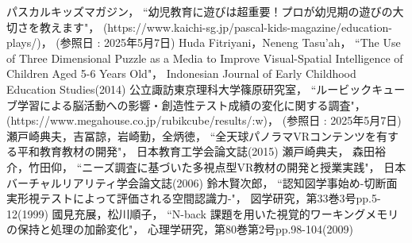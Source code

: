 \begin{thebibliography}{9}
    パスカルキッズマガジン，
    “幼児教育に遊びは超重要！プロが幼児期の遊びの大切さを教えます"，
    (https://www.kaichi-sg.jp/pascal-kids-magazine/education-plays/)，
    (参照日 : 2025年5月7日)
    Huda Fitriyani，Neneng Tasu’ah，
    “The Use of Three Dimensional Puzzle as a Media to Improve Visual-Spatial Intelligence of Children Aged 5-6 Years Old"，
    Indonesian Journal of Early Childhood Education Studies(2014)
    公立諏訪東京理科大学篠原研究室，
    “ルービックキューブ学習による脳活動への影響・創造性テスト成績の変化に関する調査"，
    (https://www.megahouse.co.jp/rubikcube/results/:w)，
    (参照日 : 2025年5月7日)
    瀬戸崎典夫，吉冨諒，岩崎勤，全炳徳，
    “全天球パノラマVRコンテンツを有する平和教育教材の開発"，
    日本教育工学会論文誌(2015)
    瀬戸崎典夫， 森田裕介，竹田仰，
    “ニーズ調査に基づいた多視点型VR教材の開発と授業実践"，
    日本バーチャルリアリティ学会論文誌(2006)
    鈴木賢次郎，
    “認知図学事始め-切断面実形視テストによって評価される空間認識力-"，
    図学研究，第33巻3号pp.5-12(1999)
    國見充展，松川順子，
    “N-back 課題を用いた視覚的ワーキングメモリの保持と処理の加齢変化"，
    心理学研究，第80巻第2号pp.98-104(2009)
\end{thebibliography}
